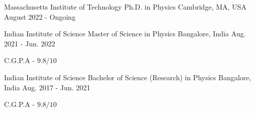 

\begin{cventries}

    \cventry
	{Massachusetts Institute of Technology} %
	{Ph.D. in Physics} %
	{Cambridge, MA, USA} %
	{August 2022 - Ongoing} %
	{
	}

    \cventry
	{Indian Institute of Science} %
	{Master of Science in Physics} %
	{Bangalore, India} %
	{Aug. 2021 - Jun. 2022} %
	{
	\begin{cvitems} %
		\item {C.G.P.A - $9.8/10$}
	\end{cvitems}
	}

  \cventry
    {Indian Institute of Science} %
    {Bachelor of Science (Research) in Physics} %
    {Bangalore, India} %
    {Aug. 2017 - Jun. 2021} %
    {
      \begin{cvitems} %
        \item {C.G.P.A - $9.8/10$}
      \end{cvitems}
    }




\end{cventries}
